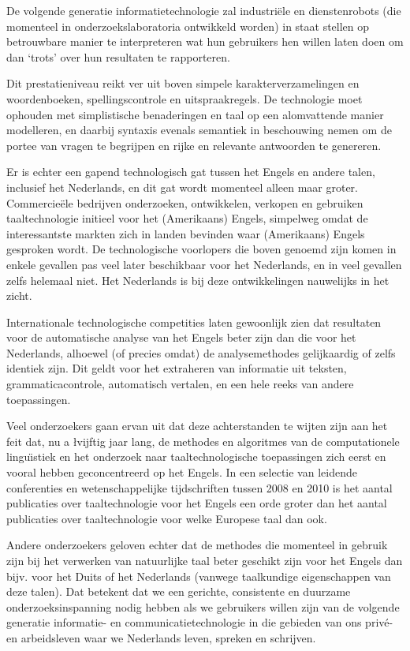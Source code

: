 \begin{multicols}{2}
De volgende generatie informatietechnologie zal industri{\"e}le en dienstenrobots (die momenteel in onderzoekslaboratoria ontwikkeld worden) in staat stellen op betrouwbare manier te interpreteren wat hun gebruikers hen willen laten doen om dan `trots' over hun resultaten te rapporteren.

Dit prestatieniveau reikt ver uit boven simpele karakterverzamelingen en woordenboeken, spellingscontrole en uitspraakregels. De technologie moet ophouden met simplistische benaderingen en taal op een alomvattende manier modelleren, en daarbij syntaxis evenals semantiek in beschouwing nemen om de portee van vragen te begrijpen en rijke en relevante antwoorden te genereren.

 Er is echter een gapend technologisch gat tussen het Engels en andere talen, inclusief het Nederlands, en dit gat wordt momenteel alleen maar groter. Commercie{\"e}le bedrijven onderzoeken, ontwikkelen, verkopen en gebruiken taaltechnologie initieel voor het (Amerikaans) Engels, simpelweg omdat de interessantste markten zich in landen bevinden waar (Amerikaans) Engels gesproken wordt. De technologische voorlopers die boven genoemd zijn komen in enkele gevallen pas veel later beschikbaar voor het Nederlands, en in veel gevallen zelfs helemaal niet. Het Nederlands is bij deze ontwikkelingen nauwelijks in het zicht.

Internationale  technologische competities laten gewoonlijk zien dat resultaten voor de automatische analyse van het Engels beter zijn dan die voor het Nederlands, alhoewel (of precies omdat) de analysemethodes gelijkaardig of zelfs identiek zijn. Dit geldt voor het extraheren van informatie uit teksten, grammaticacontrole, automatisch vertalen, en een hele reeks van andere toepassingen.

Veel onderzoekers gaan ervan uit dat deze achterstanden te wijten zijn aan het feit dat, nu a \l vijftig jaar lang, de methodes en algoritmes van de computationele lingu{\"\i}stiek en het onderzoek naar taaltechnologische toepassingen zich eerst en vooral hebben geconcentreerd op het Engels.  In een selectie van leidende conferenties en wetenschappelijke tijdschriften tussen 2008 en 2010 is het aantal publicaties over taaltechnologie voor het Engels een orde groter dan het aantal publicaties over taaltechnologie voor welke Europese taal dan ook.

Andere onderzoekers geloven echter dat de methodes die momenteel in gebruik zijn bij het verwerken van natuurlijke taal beter geschikt zijn voor het Engels dan bijv. voor het Duits of het Nederlands (vanwege taalkundige eigenschappen van deze talen). Dat betekent dat we een gerichte, consistente en duurzame onderzoeksinspanning nodig hebben als we gebruikers willen zijn van de volgende generatie informatie- en communicatietechnologie in die gebieden van ons priv{\'e}- en arbeidsleven waar we Nederlands leven, spreken en schrijven.


\end{multicols}
